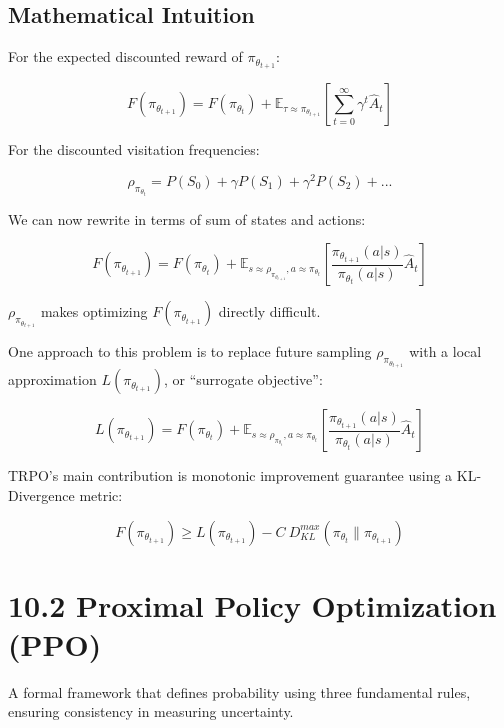 \documentclass[
  letterpaper,
  DIV=11,
  numbers=noendperiod]{scrreprt}
\begin{document}
\section{Mathematical Intuition}\label{mathematical-intuition-2}

For the expected discounted reward of \(\pi_{\theta_{t+1}}\):

\[
F(\pi_{\theta_{t+1}}) = F(\pi_{\theta_{t}}) + \mathbb{E}_{\tau \approx \pi_{\theta_{t+1}}} [\sum^{\infty}_{t=0} \gamma^{t} \hat{A}_t]
\]

For the discounted visitation frequencies:

\[
\rho_{\pi_{\theta_{t}}} = P(S_{0}) + \gamma P(S_{1}) + \gamma^{2} P(S_{2}) + ...
\]

We can now rewrite in terms of sum of states and actions:

\[
F(\pi_{\theta_{t+1}}) = F(\pi_{\theta_{t}}) + \mathbb{E}_{s \approx \rho_{\pi_{\theta_{t+1}}}, a \approx \pi_{\theta_{t}}} \left[\frac{\pi_{\theta_{t+1}}(a|s)}{\pi_{\theta_{t}}(a|s)} \hat{A}_t\right]
\]

\(\rho_{\pi_{\theta_{t+1}}}\) makes optimizing \(F(\pi_{\theta_{t+1}})\)
directly difficult.

One approach to this problem is to replace future sampling
\(\rho_{\pi_{\theta_{t+1}}}\) with a local approximation
\(L(\pi_{\theta_{t+1}})\), or ``surrogate objective'':

\[
L(\pi_{\theta_{t+1}}) =  F(\pi_{\theta_{t}}) + \mathbb{E}_{s \approx \rho_{\pi_{\theta_{t}}}, a \approx \pi_{\theta_{t}}} \left[\frac{\pi_{\theta_{t+1}}(a|s)}{\pi_{\theta_{t}}(a|s)} \hat{A}_t\right]
\]

TRPO's main contribution is monotonic improvement guarantee using a
KL-Divergence metric:

\[
F(\pi_{\theta_{t+1}}) \geq L(\pi_{\theta_{t+1}}) - C \ D^{max}_{KL}(\pi_{\theta_{t}} \| \pi_{\theta_{t+1}})
\]

\chapter{10.2 Proximal Policy Optimization
(PPO)}\label{proximal-policy-optimization-ppo}

\begin{tcolorbox}[enhanced jigsaw, colback=white, left=2mm, breakable, opacityback=0, bottomrule=.15mm, rightrule=.15mm, arc=.35mm, colframe=quarto-callout-note-color-frame, leftrule=.75mm, toprule=.15mm]

A formal framework that defines probability using three fundamental
rules, ensuring consistency in measuring uncertainty. 🎲

\end{tcolorbox}
\end{document}

